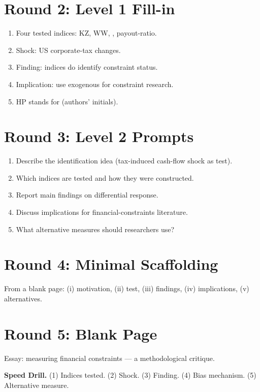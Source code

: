 \documentclass[11pt]{article}
\newcommand{\blank}[1]{\underline{\hspace{#1}}}
\begin{document}
\section*{Round 2: Level 1 Fill-in}
\begin{enumerate}
\item Four tested indices: KZ, WW, \blank{1cm}, payout-ratio.
\item Shock: US \blank{2cm} corporate-tax changes.
\item Finding: indices do \blank{2cm} identify constraint status.
\item Implication: use exogenous \blank{2cm} for constraint research.
\item HP stands for \blank{2cm} (authors' initials).
\end{enumerate}

\section*{Round 3: Level 2 Prompts}
\begin{enumerate}
\item Describe the identification idea (tax-induced cash-flow shock as test).
\item Which indices are tested and how they were constructed.
\item Report main findings on differential response.
\item Discuss implications for financial-constraints literature.
\item What alternative measures should researchers use?
\end{enumerate}

\section*{Round 4: Minimal Scaffolding}
From a blank page: (i) motivation, (ii) test, (iii) findings, (iv) implications, (v) alternatives.

\section*{Round 5: Blank Page}
Essay: measuring financial constraints --- a methodological critique.

\vspace{6pt}
\begin{drillbox}
\textbf{Speed Drill.} (1) Indices tested. (2) Shock. (3) Finding. (4) Bias mechanism. (5) Alternative measure.
\end{drillbox}
\end{document}
